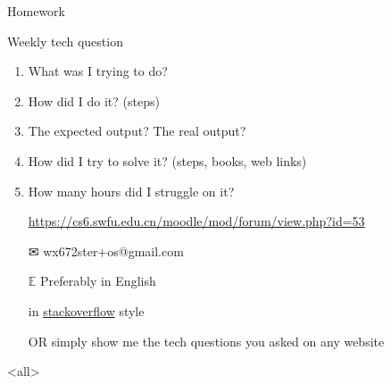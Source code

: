 \begin{frame}{{\hw\quad}Homework}
  \begin{block}{Weekly tech question}
    \begin{enumerate}
    \item What was I trying to do?
    \item How did I do it? (steps)
    \item The expected output? The real output?
    \item How did I try to solve it? (steps, books, web links)
    \item How many hours did I struggle on it?
    \end{enumerate}
  \end{block}
  \begin{itemize}
  \item[\moodle] \url{https://cs6.swfu.edu.cn/moodle/mod/forum/view.php?id=53}
  \item[\Large\dejavu ✉] \alert{\ttfamily wx672ster+os@gmail.com}%
  \item[$\mathbb{E}$] Preferably in English
  \item[\stackoverflow] in
    \href{https://stackoverflow.com/questions/39199299/what-is-the-essential-difference-between-compound-command-and-normal-command-inlink}{stackoverflow}
    style
  \item[OR] simply show me the tech questions you asked on any website
  \end{itemize}  
\end{frame}

\mode<all>
